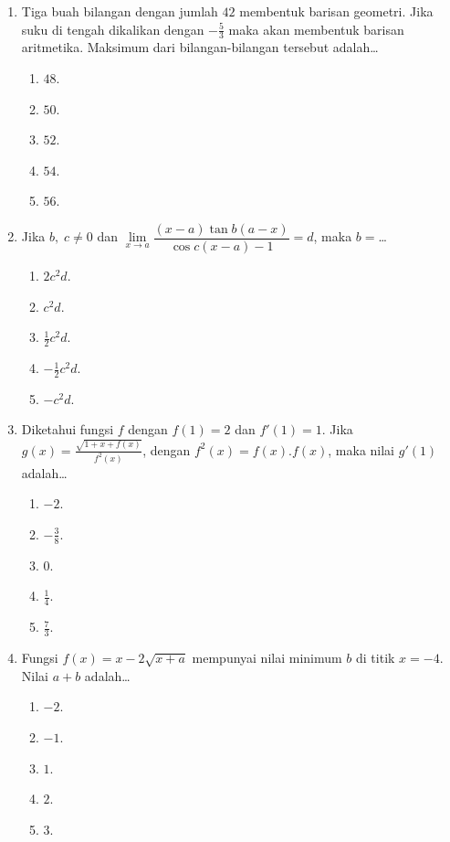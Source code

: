 \documentclass[A4,12PT, english, twocolumn]{journal}
\begin{document}
\begin{enumerate}
\item Tiga buah bilangan dengan jumlah $42$ membentuk barisan geometri. Jika suku di tengah dikalikan dengan $-\frac{5}{3}$ maka akan membentuk barisan aritmetika. Maksimum dari bilangan-bilangan tersebut adalah\dots
    \begin{enumerate}
        \item $48$.
        \item $50$.
        \item $52$.
        \item $54$.
        \item $56$.
    \end{enumerate}

\item Jika $b, \; c \ne 0$ dan $\lim\limits_{x \longrightarrow a}\dfrac{(x-a)\tan b(a-x)}{\cos c(x-a)-1}=d$, maka $b =$\dots
    \begin{enumerate}
        \item $2{{c}^{2}}d$.
        \item ${{c}^{2}}d$.
        \item $\frac{1}{2}{{c}^{2}}d$.
        \item $-\frac{1}{2}{{c}^{2}}d$.
        \item $-{{c}^{2}}d$.
    \end{enumerate}

\item Diketahui fungsi $f$ dengan $f(1)=2$ dan $f'(1)=1$. Jika $g(x)=\frac{\sqrt{1+x+f(x)}}{{{f}^{2}}(x)}$, dengan ${{f}^{2}}(x)=f(x).f(x)$, maka nilai $g'(1)$ adalah\dots
    \begin{enumerate}
        \item $-2$.
        \item $-\frac{3}{8}$.
        \item $0$.
        \item $\frac{1}{4}$.
        \item $\frac{7}{3}$.
    \end{enumerate}

\item Fungsi $f(x)=x-2\sqrt{x+a}$ mempunyai nilai minimum $b$ di titik $x=-4$. Nilai $a+b$ adalah\dots
    \begin{enumerate}
        \item $-2$.
        \item $-1$.
        \item $1$.
        \item $2$.
        \item $3$.
    \end{enumerate}


\end{enumerate}
\end{document}
